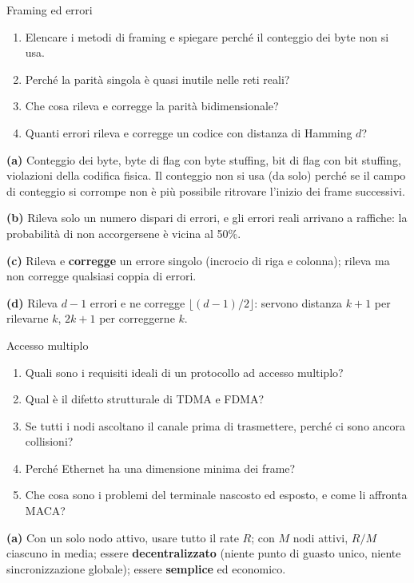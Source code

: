 \begin{esercizio}{Framing ed errori}
\begin{enumerate}[label=(\alph*)]
    \item Elencare i metodi di framing e spiegare perché il conteggio dei byte non si usa.
    \item Perché la parità singola è quasi inutile nelle reti reali?
    \item Che cosa rileva e corregge la parità bidimensionale?
    \item Quanti errori rileva e corregge un codice con distanza di Hamming $d$?
\end{enumerate}
\end{esercizio}

\svolgimento
\textbf{(a)} Conteggio dei byte, byte di flag con byte stuffing, bit di flag con bit stuffing, violazioni della codifica fisica. Il
conteggio non si usa (da solo) perché se il campo di conteggio si corrompe non è più possibile ritrovare l'inizio dei frame successivi.

\textbf{(b)} Rileva solo un numero dispari di errori, e gli errori reali arrivano a raffiche: la probabilità di non accorgersene è vicina al 50\%.

\textbf{(c)} Rileva e \textbf{corregge} un errore singolo (incrocio di riga e colonna); rileva ma non corregge qualsiasi coppia di errori.

\textbf{(d)} Rileva $d - 1$ errori e ne corregge $\lfloor (d-1)/2 \rfloor$: servono distanza $k + 1$ per rilevarne $k$, $2k + 1$ per correggerne $k$.

\begin{esercizio}{Accesso multiplo}
\begin{enumerate}[label=(\alph*)]
    \item Quali sono i requisiti ideali di un protocollo ad accesso multiplo?
    \item Qual è il difetto strutturale di TDMA e FDMA?
    \item Se tutti i nodi ascoltano il canale prima di trasmettere, perché ci sono ancora collisioni?
    \item Perché Ethernet ha una dimensione minima dei frame?
    \item Che cosa sono i problemi del terminale nascosto ed esposto, e come li affronta MACA?
\end{enumerate}
\end{esercizio}

\svolgimento
\textbf{(a)} Con un solo nodo attivo, usare tutto il rate $R$; con $M$ nodi attivi, $R/M$ ciascuno in media; essere
\textbf{decentralizzato} (niente punto di guasto unico, niente sincronizzazione globale); essere \textbf{semplice} ed economico.

